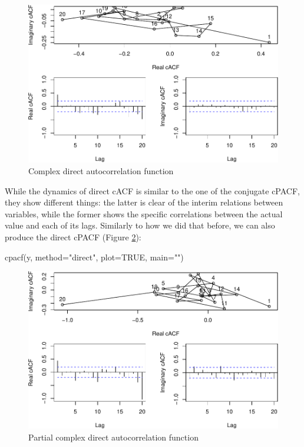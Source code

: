 \documentclass[
]{book}
\newenvironment{Shaded}{\begin{snugshade}}{\end{snugshade}}
\newcommand{\AttributeTok}[1]{\textcolor[rgb]{0.77,0.63,0.00}{#1}}
\newcommand{\ConstantTok}[1]{\textcolor[rgb]{0.00,0.00,0.00}{#1}}
\newcommand{\FunctionTok}[1]{\textcolor[rgb]{0.00,0.00,0.00}{#1}}
\newcommand{\NormalTok}[1]{#1}
\newcommand{\StringTok}[1]{\textcolor[rgb]{0.31,0.60,0.02}{#1}}
\begin{document}
\begin{figure}
\centering
\includegraphics{Svetunkov---Svetunkov---Complex-Valued-Econometrics_files/figure-latex/complexAR1ACFDir-1.pdf}
\caption{\label{fig:complexAR1ACFDir}Complex direct autocorrelation function}
\end{figure}

While the dynamics of direct cACF is similar to the one of the conjugate cPACF, they show different things: the latter is clear of the interim relations between variables, while the former shows the specific correlations between the actual value and each of its lags. Similarly to how we did that before, we can also produce the direct cPACF (Figure \ref{fig:complexAR1PACFDir}):

\begin{Shaded}
\begin{Highlighting}[]
\FunctionTok{cpacf}\NormalTok{(y, }\AttributeTok{method=}\StringTok{"direct"}\NormalTok{, }\AttributeTok{plot=}\ConstantTok{TRUE}\NormalTok{, }\AttributeTok{main=}\StringTok{""}\NormalTok{)}
\end{Highlighting}
\end{Shaded}

\begin{figure}
\centering
\includegraphics{Svetunkov---Svetunkov---Complex-Valued-Econometrics_files/figure-latex/complexAR1PACFDir-1.pdf}
\caption{\label{fig:complexAR1PACFDir}Partial complex direct autocorrelation function}
\end{figure}
\end{document}
